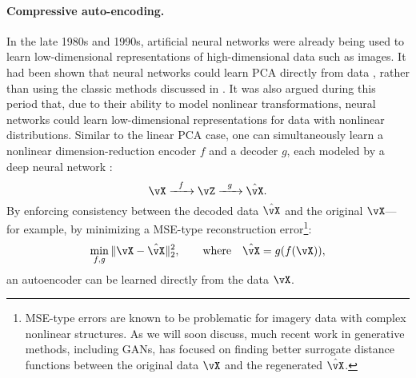 \documentclass[../../book-main.tex]{subfiles}
\begin{document}
\paragraph{Compressive auto-encoding.}
In the late 1980s and 1990s, artificial neural networks were already being used to learn low-dimensional representations of high-dimensional data such as images. It had been shown that neural networks could learn PCA directly from data \cite{Oja1982SimplifiedNM,Baldi89}, rather than using the classic methods discussed in . It was also argued during this period that, due to their ability to model nonlinear transformations, neural networks could learn low-dimensional representations for data with nonlinear distributions. Similar to the linear PCA case, one can simultaneously learn a nonlinear dimension-reduction encoder \(f\) and a decoder \(g\), each modeled by a deep neural network \cite{Rumelhart1986,Kramer1991NonlinearPC}:
\begin{equation}
    \vX   \xrightarrow{\hspace{2mm} f \hspace{2mm}} \vZ  \xrightarrow{\hspace{2mm} g \hspace{2mm}} \hat{\vX}.
       \label{eqn:auto-encoding-deep-networks}
\end{equation}
By enforcing consistency between the decoded data \(\hat{\vX}\) and the original \(\vX\)---for example, by minimizing a MSE-type reconstruction error\footnote{MSE-type errors are known to be problematic for imagery data with complex nonlinear structures. As we will soon discuss, much recent work in generative methods, including GANs, has focused on finding better surrogate distance functions between the original data \(\vX\) and the regenerated \(\hat{\vX}\).}:
\begin{equation}
    \min_{f,g} \|\vX - \hat{\vX}\|_{2}^{2}, \qquad \text{where} \quad \hat{\vX} = g(f(\vX)),
\end{equation}
an autoencoder can be learned directly from the data \(\vX\).
\end{document}
